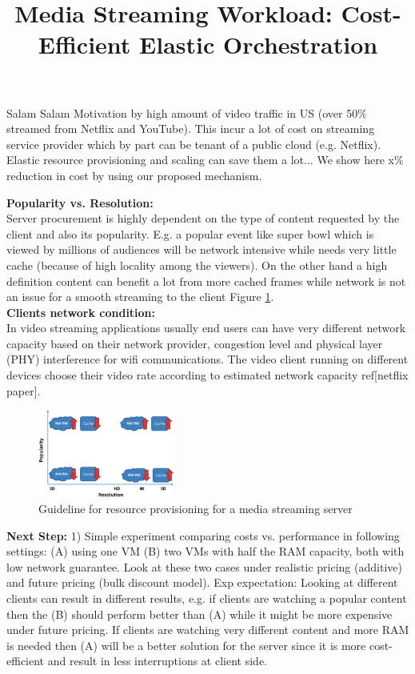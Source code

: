 \documentclass[12 pt]{article}
\begin{document}
\title{Media Streaming Workload: Cost-Efficient Elastic Orchestration}
\date{}
\maketitle
Salam Salam
Motivation by high amount of video traffic in US (over 50$\%$ streamed from Netflix and YouTube). This incur a lot of cost on streaming service provider which by part can be tenant of a public cloud (e.g. Netflix). Elastic resource provisioning and scaling can save them a lot... We show here x$\%$ reduction in cost by using our proposed mechanism. %

{\bf Popularity vs. Resolution:}\\
Server procurement is highly dependent on the type of content requested by the client and also its popularity. E.g. a popular event like super bowl which is viewed by millions of audiences will be network intensive while needs very little cache (because of high locality among the viewers). On the other hand a high definition content can benefit a lot from more cached frames while network is not an issue for a smooth streaming to the client Figure \ref{fig:spectrum}.
\\

{\bf Clients network condition:} \\
In video streaming applications usually end users can have very different network capacity based on their network provider, congestion level and physical layer (PHY) interference for wifi communications. The video client running on different devices choose their video rate according to estimated network capacity ref[netflix paper].

\begin{figure}[!htb]
\centering
\includegraphics[trim={1cm 0.6cm 5cm 1cm},width=0.4\textwidth]{./spectrum.eps}
\caption{Guideline for resource provisioning for a media streaming server}\label{fig:spectrum}
\end{figure}

{\bf Next Step:} 1) Simple experiment comparing costs vs. performance in following settings: (A) using one VM (B) two VMs with half the RAM capacity, both with low network guarantee. Look at these two cases under realistic pricing (additive) and future pricing (bulk discount model).
Exp expectation: Looking at different clients can result in different results, e.g. if clients are watching a popular content then the (B) should perform better than (A) while it might be more expensive under future pricing. If clients are watching very different content and more RAM is needed then (A) will be a better solution for the server since it is more cost-efficient and result in less interruptions at client side.
\end{document}
